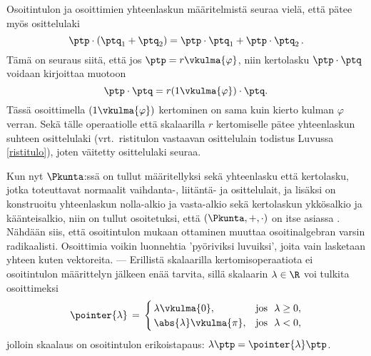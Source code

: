 Osoitintulon ja osoittimien yhteenlaskun määritelmistä seuraa vielä, että pätee myös
osittelulaki
\[
\ptp \cdot (\ptq_1 + \ptq_2) = \ptp \cdot \ptq_1 + \ptp \cdot \ptq_2\,.
\]
Tämä on seuraus siitä, että jos $\ptp = r \vkulma{\varphi}$, niin kertolasku $\ptp \cdot \ptq$
voidaan kirjoittaa muotoon
\[
\ptp \cdot \ptq = r (1\vkulma{\varphi}) \cdot \ptq.
\]
Tässä osoittimella $(1\vkulma{\varphi})$ kertominen on sama kuin kierto kulman $\varphi$
verran. Sekä tälle operaatiolle että skalaarilla $r$ kertomiselle pätee yhteenlaskun suhteen 
osittelulaki (vrt.\ ristitulon vastaavan osittelulain todistus Luvussa \ref{ristitulo}), joten 
väitetty osittelulaki seuraa.

Kun nyt $\Pkunta$:ssä on tullut määritellyksi sekä yhteenlasku että kertolasku, jotka 
toteuttavat normaalit vaihdanta-, liitäntä- ja osittelulait, ja lisäksi on konstruoitu
yhteenlaskun nolla-alkio ja vasta-alkio sekä kertolaskun ykkösalkio ja käänteisalkio, niin on 
tullut osoitetuksi, että $(\Pkunta,+,\cdot)$ on itse asiassa . Nähdään siis, että 
osoitintulon mukaan ottaminen muuttaa osoitinalgebran varsin radikaalisti. Osoittimia voikin
luonnehtia 'pyöriviksi luvuiksi', joita vain lasketaan yhteen kuten vektoreita. --- Erillistä
skalaarilla kertomisoperaatiota ei osoitintulon määrittelyn jälkeen enää tarvita, sillä
skalaarin $\lambda\in\R$ voi tulkita osoittimeksi
\[
\pointer{\lambda} \,=\, \begin{cases}
                        \,\lambda \vkulma{0},        &\text{jos }\ \lambda \ge 0, \\
                        \,\abs{\lambda}\vkulma{\pi}, &\text{jos }\ \lambda <0,
                        \end{cases}
\]
jolloin skaalaus on osoitintulon erikoistapaus: $\lambda\ptp=\pointer{\lambda}\ptp$.
 
